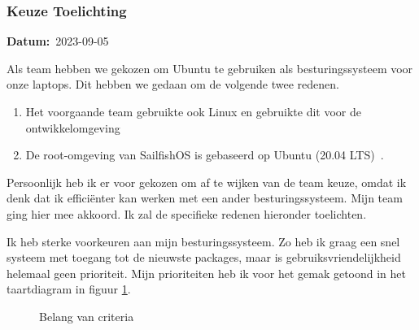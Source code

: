 \documentclass[a4paper]{report}
\newcommand{\timestamp}[1]{
  \mbox{\scriptsize \textbf{Datum:} #1} \smallbreak
}
\begin{document}
\subsubsection{Keuze Toelichting}
\timestamp{2023-09-05}
Als team hebben we gekozen om Ubuntu te gebruiken als besturingssysteem voor onze laptops. 
Dit hebben we gedaan om de volgende twee redenen.
\begin{enumerate}
  \item Het voorgaande team gebruikte ook Linux en gebruikte dit voor de ontwikkelomgeving~\cite{fairphonegithub}
  \item De root-omgeving van SailfishOS is gebaseerd op Ubuntu (20.04 LTS)~\cite{sailfishportingguide}.
\end{enumerate}

Persoonlijk heb ik er voor gekozen om af te wijken van de team keuze, omdat ik denk dat ik efficiënter kan werken met een ander besturingssysteem.
Mijn team ging hier mee akkoord. Ik zal de specifieke redenen hieronder toelichten.
\par\smallskip
Ik heb sterke voorkeuren aan mijn besturingssysteem. Zo heb ik graag een snel systeem met toegang tot de nieuwste packages, maar is gebruiksvriendelijkheid helemaal geen prioriteit.
Mijn prioriteiten heb ik voor het gemak getoond in het taartdiagram in figuur \ref{graph:spec_percentages}.
\begin{figure}[H]
  \centering
{}
\caption{Belang van criteria}
\label{graph:spec_percentages}
\end{figure}
\end{document}
